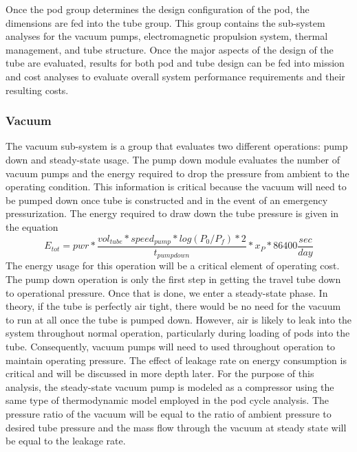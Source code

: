 	Once the pod group determines the design configuration of the pod, the
	dimensions are fed into the tube group. This group contains the sub-system
	analyses for the vacuum pumps, electromagnetic propulsion system, thermal
	management, and tube structure. Once the major aspects of the design of the
	tube are evaluated, results for both pod and tube design can be fed into
	mission and cost analyses to evaluate overall system performance
	requirements and their resulting costs.

\subsubsection{Vacuum}
	The vacuum sub-system is a group that evaluates two different
	operations: pump down and steady-state usage. The pump down module
	evaluates the number of vacuum pumps and the energy required to drop the pressure
	from ambient to the operating condition. This
	information is critical because the vacuum will need to be pumped down
	once tube is constructed and in the event of an emergency pressurization.
	The energy required to draw down the tube pressure is given in the equation
	\begin{equation}
		\label{eq:vacuum}
		E_{tot} = pwr * \frac{vol_{tube}*speed_{pump}*log(P_{0}/P_{f})*2}{t_{pumpdown}}* x_{P} * 86400 \frac{sec}{day}
	\end{equation}
	The energy usage for this operation will be a critical element of
	operating cost. The pump down operation is only the first step in getting
	the travel tube down to operational pressure. Once that is done, we enter
	a steady-state phase. In theory, if the tube is perfectly air tight, there
	would be no need for the vacuum to run at all once the tube is pumped
	down. However, air is likely to leak into the system throughout normal
	operation, particularly during loading of pods into the tube.
	Consequently, vacuum pumps will need to used throughout operation to
	maintain operating pressure. The effect of leakage rate on energy
	consumption is critical and will be discussed in more depth later. For the
	purpose of this analysis, the steady-state vacuum pump is modeled as a
	compressor using the same type of thermodynamic model employed in the pod
	cycle analysis. The pressure ratio
	of the vacuum will be equal to the ratio of ambient pressure to desired
	tube pressure and the mass flow through the vacuum at steady state will be
	equal to the leakage rate.
